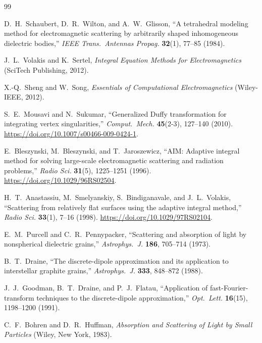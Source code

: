 \documentclass[11pt,a4paper]{article}
\begin{document}
\begin{thebibliography}{99}

  D.~H.~Schaubert, D.~R.~Wilton, and A.~W.~Glisson,
  ``A tetrahedral modeling method for electromagnetic scattering by
  arbitrarily shaped inhomogeneous dielectric bodies,''
  \textit{IEEE Trans.\ Antennas Propag.} \textbf{32}(1), 77--85 (1984).

  J.~L.~Volakis and K.~Sertel,
  \textit{Integral Equation Methods for Electromagnetics}
  (SciTech Publishing, 2012).

  X.-Q.~Sheng and W.~Song,
  \textit{Essentials of Computational Electromagnetics}
  (Wiley-IEEE, 2012).

  S.~E.~Mousavi and N.~Sukumar,
  ``Generalized Duffy transformation for integrating vertex singularities,''
  \textit{Comput.\ Mech.} \textbf{45}(2-3), 127--140 (2010).
  \url{https://doi.org/10.1007/s00466-009-0424-1}.

  E.~Bleszynski, M.~Bleszynski, and T.~Jaroszewicz,
  ``AIM: Adaptive integral method for solving large-scale electromagnetic
  scattering and radiation problems,''
  \textit{Radio Sci.} \textbf{31}(5), 1225--1251 (1996).
  \url{https://doi.org/10.1029/96RS02504}.

  H.~T.~Anastassiu, M.~Smelyanskiy, S.~Bindiganavale, and J.~L.~Volakis,
  ``Scattering from relatively flat surfaces using the adaptive integral
  method,''
  \textit{Radio Sci.} \textbf{33}(1), 7--16 (1998).
  \url{https://doi.org/10.1029/97RS02104}.

  E.~M.~Purcell and C.~R.~Pennypacker,
  ``Scattering and absorption of light by nonspherical dielectric grains,''
  \textit{Astrophys.\ J.} \textbf{186}, 705--714 (1973).

  B.~T.~Draine,
  ``The discrete-dipole approximation and its application to interstellar
  graphite grains,''
  \textit{Astrophys.\ J.} \textbf{333}, 848--872 (1988).

  J.~J.~Goodman, B.~T.~Draine, and P.~J.~Flatau,
  ``Application of fast-Fourier-transform techniques to the discrete-dipole
  approximation,''
  \textit{Opt.\ Lett.} \textbf{16}(15), 1198--1200 (1991).

  C.~F.~Bohren and D.~R.~Huffman,
  \textit{Absorption and Scattering of Light by Small Particles}
  (Wiley, New York, 1983).


\end{thebibliography}
\end{document}
